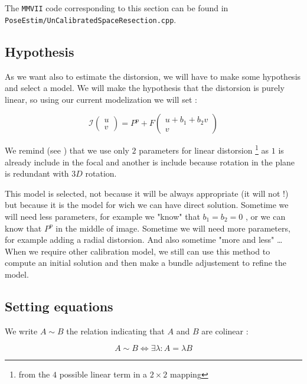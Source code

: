 The {\tt MMVII} code corresponding to this section can be found in 
{\tt PoseEstim/UnCalibratedSpaceResection.cpp}.

\subsection{Hypothesis}

As we want also to estimate the distorsion, we will have to make some hypothesis
and select a model.  We will make the hypothesis that the distorsion is purely linear, so using
our current modelization we will set :

\begin{equation}
	\mathcal{I}  \begin{pmatrix} u \\ v \end{pmatrix}  = P^p + F \begin{pmatrix} u + b_1 + b_2 v \\ v \end{pmatrix} 
\end{equation}

We remind (see \RefFantome) that we use  only $2$ parameters for linear distorsion 
\footnote {from the $4$ possible linear term in a $2 \times 2$ mapping}
 as $1$ is already include in the focal and another is include
because rotation in the plane is redundant with $3D$ rotation. 

This model is selected, not because it will be always appropriate (it will not !) but because
it is the model  for wich we can have direct solution. Sometime we will need less parameters,
for example we "know" that $b_1=b_2=0$ , or we can  know that $P^p$ in the middle of image. Sometime
we will need more parameters, for example adding a radial distorsion. And also sometime
"more and less" \dots When we require other calibration model, we still can use this method to compute
an initial solution and then make a bundle adjustement to refine the model.


\subsection{Setting equations}

We write $A \sim B$ the relation indicating that $A$ and $B$ are colinear :

\begin{equation}
	  A \sim B   \Leftrightarrow  \exists \lambda : A =  \lambda B
\end{equation}

